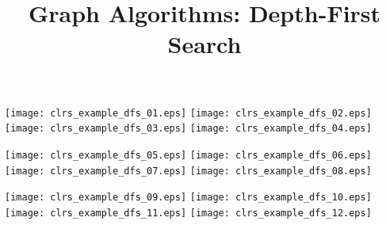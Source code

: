 \documentclass{article}
\title{Graph Algorithms: Depth-First Search}
\begin{document}
\maketitle
{}\vspace{1em}


\vspace{1em}


\texttt{[image: clrs\_example\_dfs\_01.eps]}
\vspace{1em}
\texttt{[image: clrs\_example\_dfs\_02.eps]}
\vspace{1em}
\texttt{[image: clrs\_example\_dfs\_03.eps]}
\vspace{1em}
\texttt{[image: clrs\_example\_dfs\_04.eps]}
\vspace{1em}


\texttt{[image: clrs\_example\_dfs\_05.eps]}
\vspace{1em}
\texttt{[image: clrs\_example\_dfs\_06.eps]}
\vspace{1em}
\texttt{[image: clrs\_example\_dfs\_07.eps]}
\vspace{1em}
\texttt{[image: clrs\_example\_dfs\_08.eps]}
\vspace{1em}


\texttt{[image: clrs\_example\_dfs\_09.eps]}
\vspace{1em}
\texttt{[image: clrs\_example\_dfs\_10.eps]}
\vspace{1em}
\texttt{[image: clrs\_example\_dfs\_11.eps]}
\vspace{1em}
\texttt{[image: clrs\_example\_dfs\_12.eps]}
\end{document}
